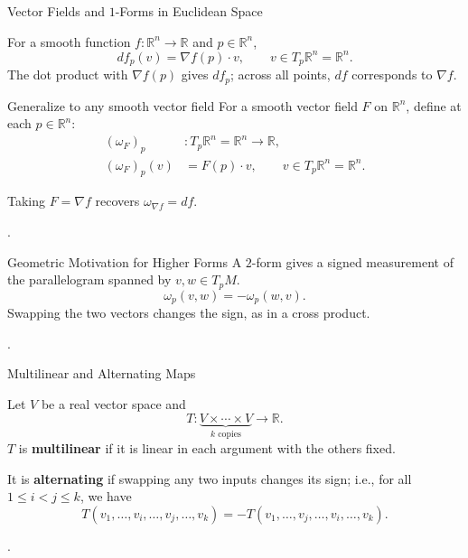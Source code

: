 \documentclass[aspectratio=169,11pt]{beamer}
\newcommand{\sources}[1]{\par\vfill{\scriptsize\color{black!75}#1\par}}
\begin{document}
\begin{frame}{Vector Fields and $1$-Forms in Euclidean Space}
  \begin{example}
    For a smooth function $f\colon\mathbb{R}^n\to\mathbb{R}$ and
    $p\in\mathbb{R}^n$,
    \begin{equation}
      df_p(v)=\nabla f(p)\cdot v,
      \qquad v\in T_p\mathbb{R}^n=\mathbb{R}^n.
    \end{equation}
    The dot product with $\nabla f(p)$ gives $df_p$; across all points,
    $df$ corresponds to $\nabla f$.
  \end{example}
  \begin{block}{Generalize to any smooth vector field}
    For a smooth vector field $F$ on $\mathbb{R}^n$, define at each
    $p\in\mathbb{R}^n$:
    \begin{equation}
      \begin{aligned}
        (\omega_F)_p&\colon T_p\mathbb{R}^n=\mathbb{R}^n\longrightarrow\mathbb{R},\\
        (\omega_F)_p(v)&=F(p)\cdot v,
        \qquad v\in T_p\mathbb{R}^n=\mathbb{R}^n.
      \end{aligned}
    \end{equation}
  \end{block}
  Taking $F=\nabla f$ recovers $\omega_{\nabla f}=df$.
  \sources{\cite[Chapter~11; Equation~(14.27), p.~368]{lee2013smooth}.}
\end{frame}

\begin{frame}{Geometric Motivation for Higher Forms}
  A $2$-form gives a signed measurement of the parallelogram spanned by
  $v,w\in T_pM$.
  \begin{equation}
    \omega_p(v,w)=-\omega_p(w,v).
  \end{equation}
  Swapping the two vectors changes the sign, as in a cross product.
  \sources{\cite[Chapter~14]{lee2013smooth}.}
\end{frame}

\begin{frame}{Multilinear and Alternating Maps}
  \begin{definition}
    Let $V$ be a real vector space and
    \begin{equation}
      T\colon\underbrace{V\times\cdots\times V}_{k\text{ copies}}
      \longrightarrow\mathbb{R}.
    \end{equation}
    $T$ is \textbf{multilinear} if it is linear in each argument with the others fixed.

    \medskip
    It is \textbf{alternating} if swapping any two inputs changes its sign;
    i.e., for all $1\le i<j\le k$, we have
    \begin{equation}
      T(v_1,\ldots,v_i,\ldots,v_j,\ldots,v_k)
      =-T(v_1,\ldots,v_j,\ldots,v_i,\ldots,v_k).
    \end{equation}
  \end{definition}
  \sources{\cite[\S26, p.~220; \S27, pp.~229--230]{munkres1991analysis}.}
\end{frame}
\end{document}
